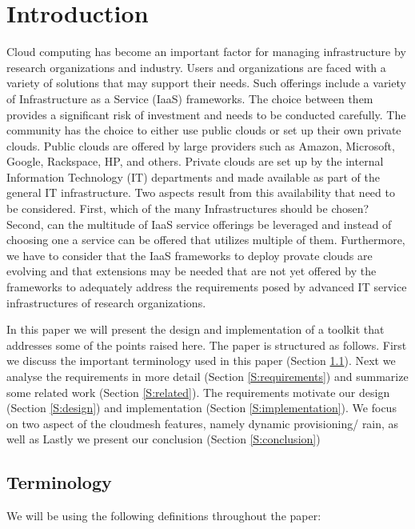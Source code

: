 \documentclass{tex/sig-alternate-2013}
\newcommand{\todo}[1]{{\color{red}{#1}}}
\begin{document}
\section{Introduction}
\todo{READ}
Cloud computing has become an important factor for managing
infrastructure by research organizations and industry. Users and
organizations are faced with a variety of solutions that may support
their needs. Such offerings include a variety of Infrastructure as a
Service (IaaS) frameworks. The choice between them provides a
significant risk of investment and needs to be conducted
carefully. The community has the choice to either use public clouds or
set up their own private clouds. Public clouds are 
offered by large providers such as Amazon, Microsoft, Google,
Rackspace, HP, and others. Private clouds are set up by the internal
Information Technology (IT) departments and made available as part of
the general IT infrastructure. Two aspects result from this
availability that need to be considered. First, which of the many
Infrastructures should be chosen? Second, can the multitude of IaaS
service offerings be leveraged and instead of choosing one a service can
be offered that utilizes multiple of them. Furthermore, we have to
consider that the IaaS frameworks to deploy provate clouds are
evolving and that extensions may be needed that are not yet offered by
the frameworks to adequately address the requirements posed by
advanced IT service infrastructures of research organizations.

In this paper we will present the design and implementation of a
toolkit that addresses some of the points raised here.  The paper is
structured as follows. First we discuss the important terminology used
in this paper (Section \ref{S:terminology}). Next we analyse the
requirements in more detail (Section \ref{S:requirements}) and
summarize some related work (Section \ref{S:related}). The
requirements motivate our design (Section \ref{S:design}) and
implementation (Section \ref{S:implementation}). We focus on two
aspect of the cloudmesh features, namely dynamic provisioning/ rain,
as well as Lastly we present our conclusion (Section
\ref{S:conclusion})

\subsection{Terminology} \label{S:terminology}

\todo{READ}
We will be using the following definitions throughout the paper:
\end{document}
